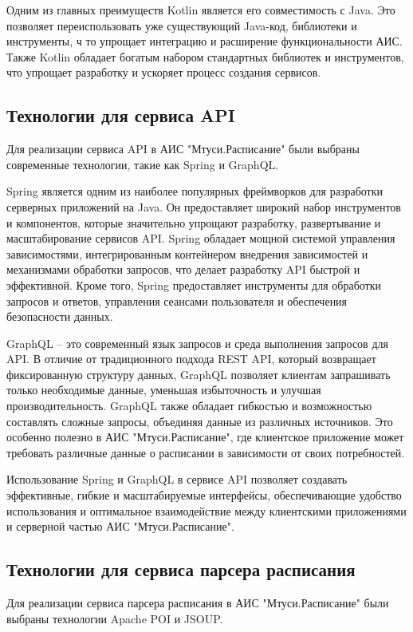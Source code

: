 Одним из главных преимуществ Kotlin является его совместимость с Java. 
Это позволяет переиспользовать уже существующий Java-код, библиотеки и инструменты, ч
то упрощает интеграцию и расширение функциональности АИС. 
Также Kotlin обладает богатым набором стандартных библиотек и инструментов, 
что упрощает разработку и ускоряет процесс создания сервисов.

\subsection{Технологии для сервиса API}
Для реализации сервиса API в АИС "Мтуси.Расписание" были выбраны современные технологии, такие как Spring и GraphQL.

Spring является одним из наиболее популярных фреймворков для разработки серверных приложений на Java. 
Он предоставляет широкий набор инструментов и компонентов, которые значительно упрощают разработку, 
развертывание и масштабирование сервисов API. Spring обладает мощной системой управления зависимостями, 
интегрированным контейнером внедрения зависимостей и механизмами обработки запросов, 
что делает разработку API быстрой и эффективной. Кроме того, 
Spring предоставляет инструменты для обработки запросов и ответов, управления сеансами пользователя и обеспечения безопасности данных.

GraphQL -- это современный язык запросов и среда выполнения запросов для API. 
В отличие от традиционного подхода REST API, который возвращает фиксированную структуру данных, 
GraphQL позволяет клиентам запрашивать только необходимые данные, 
уменьшая избыточность и улучшая производительность. 
GraphQL также обладает гибкостью и возможностью составлять сложные запросы, объединяя данные из различных источников. 
Это особенно полезно в АИС "Мтуси.Расписание", где клиентское приложение может требовать 
различные данные о расписании в зависимости от своих потребностей.

Использование Spring и GraphQL в сервисе API позволяет создавать эффективные, 
гибкие и масштабируемые интерфейсы, обеспечивающие удобство использования и 
оптимальное взаимодействие между клиентскими приложениями и серверной частью АИС "Мтуси.Расписание".

\subsection{Технологии для сервиса парсера расписания}
Для реализации сервиса парсера расписания в АИС "Мтуси.Расписание" были выбраны технологии Apache POI и JSOUP.

